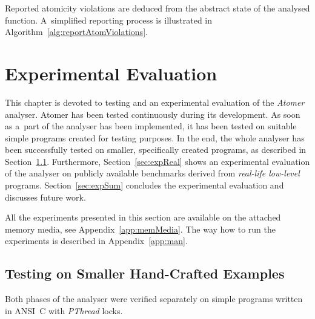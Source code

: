Reported atomicity violations are deduced from the abstract state of
the analysed function. A~simplified reporting process is illustrated in
Algorithm~\ref{alg:reportAtomViolations}.

\begin{algorithm}[hbt]



    \caption{%
        Reporting atomicity violations from the abstract state of
        an analysed function
    }
    \label{alg:reportAtomViolations}
\end{algorithm}



\chapter{Experimental Evaluation}
\label{chap:exp}

This chapter is devoted to testing and an experimental evaluation of
the \emph{Atomer} analyser. Atomer has been tested continuously during
its development. As soon as a~part of the analyser has been implemented, 
it has been tested on suitable simple programs created for testing purposes. 
In the end, the whole analyser has been successfully tested on smaller,
specifically created programs, as described in Section~\ref{sec:expPurpos}. 
Furthermore, Section~\ref{sec:expReal} shows an experimental evaluation of 
the analyser on publicly available benchmarks derived from \emph{real-life
low-level} programs. Section~\ref{sec:expSum} concludes the experimental
evaluation and discusses future work.

All the experiments presented in this section are available on
the attached memory media, see Appendix~\ref{app:memMedia}. The way how 
to run the experiments is described in Appendix~\ref{app:man}.


\section{Testing on Smaller Hand-Crafted Examples}
\label{sec:expPurpos}

Both phases of the analyser were verified separately on simple programs 
written in ANSI~C with \emph{PThread} locks.

